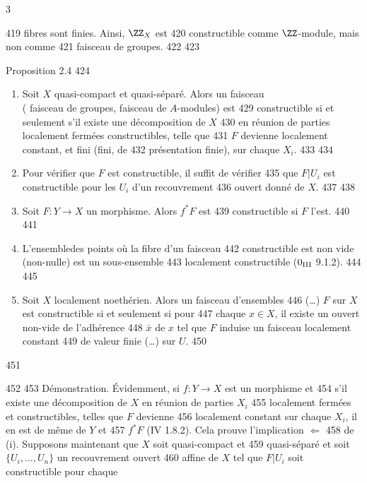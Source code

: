3	\documentclass[10pt]{../fichiers-configuration-latex/smfart}
\begin{document}
   419	fibres sont finies. Ainsi, $\ZZ_X$ est
   420	constructible comme $\ZZ$-module, mais non comme
   421	faisceau de groupes.
   422	
   423	\begin{enonce*}{Proposition 2.4}
   424	\begin{enumerate}
   425	\renewcommand{\theenumi}{\roman{enumi}}
   426	\renewcommand{\labelenumi}{(\theenumi)}
   427	\item Soit $X$ quasi-compact et quasi-séparé. Alors un faisceau \\ (	  faisceau de groupes, \resp faisceau de $A$-modules) est
   429	  constructible si et seulement s'il existe une décomposition de $X$
   430	  en réunion de parties localement fermées constructibles, telle que
   431	  $F$ devienne localement constant, et fini (\resp fini, \resp de
   432	  présentation finie), sur chaque $X_i$.
   433	
   434	\item Pour vérifier que $F$ est constructible, il suffit de vérifier
   435	  que $F| U_i$ est constructible pour les $U_i$ d'un recouvrement
   436	  ouvert donné de $X$.
   437	
   438	\item Soit $F:Y\rightarrow X$ un morphisme. Alors $f^{\ast}F$ est
   439	  constructible si $F$ l'est.
   440	
   441	\item L'ensemble\pageoriginale des points où la fibre d'un faisceau
   442	  constructible est non vide (\resp non-nulle) est un sous-ensemble
   443	  localement constructible {\rm (\EGA $0_{\rm III}$ 9.1.2)}.
   444	
   445	\item Soit $X$ localement noethérien. Alors un faisceau d'ensembles
   446	  (\resp\ldots) $F$ sur $X$ est constructible si et seulement si pour
   447	  chaque $x\in X$, il existe un ouvert non-vide de l'adhérence
   448	  $\bar{x}$ de $x$ tel que $F$ induise un faisceau localement constant
   449	  de valeur finie (\resp\ldots) sur $U$.
   450	\end{enumerate}
   451	\end{enonce*}
   452	
   453	Démonstration. Évidemment, si $f:Y\rightarrow X$ est un morphisme et
   454	s'il existe une décomposition de $X$ en réunion de parties $X_i$
   455	localement fermées et constructibles, telles que $F$ devienne
   456	localement constant sur chaque $X_i$, il en est de même de $Y$ et
   457	$f^{\ast}F$ (\cf \EGA IV 1.8.2). Cela prouve l'implication $\Leftarrow$
   458	de (i). Supposons maintenant que $X$ soit quasi-compact et
   459	quasi-séparé et soit $\{U_i,\ldots,U_n\}$ un recouvrement ouvert
   460	affine de $X$ tel que $F|U_i$ soit constructible pour chaque
\end{document}

